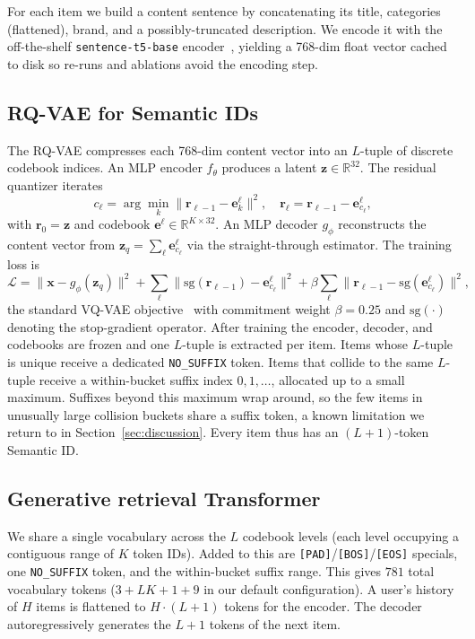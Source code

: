 \documentclass[sigconf]{acmart}
\begin{document}
For each item we build a content sentence by concatenating its title,
categories (flattened), brand, and a possibly-truncated description.
We encode it with the off-the-shelf \texttt{sentence-t5-base}
encoder~\cite{ni2022sentence}, yielding a 768-dim float vector cached
to disk so re-runs and ablations avoid the encoding step.

\subsection{RQ-VAE for Semantic IDs}
The RQ-VAE compresses each 768-dim content vector into an $L$-tuple of
discrete codebook indices.  An MLP encoder $f_\theta$ produces a latent
$\mathbf{z}\in\mathbb{R}^{32}$. The residual quantizer iterates
\[
  c_\ell = \arg\min_{k}\Big\lVert \mathbf{r}_{\ell-1} - \mathbf{e}^\ell_k \Big\rVert^2,\quad
  \mathbf{r}_\ell = \mathbf{r}_{\ell-1} - \mathbf{e}^\ell_{c_\ell},
\]
with $\mathbf{r}_0{=}\mathbf{z}$ and codebook
$\mathbf{e}^\ell\in\mathbb{R}^{K\times 32}$.  An MLP decoder
$g_\phi$ reconstructs the content vector from
$\mathbf{z}_q = \sum_\ell \mathbf{e}^\ell_{c_\ell}$ via the
straight-through estimator.  The training loss is
\[
  \mathcal{L} =
  \lVert \mathbf{x} - g_\phi(\mathbf{z}_q) \rVert^2 +
  \sum_\ell \lVert \mathrm{sg}(\mathbf{r}_{\ell-1}) - \mathbf{e}^\ell_{c_\ell} \rVert^2 +
  \beta \sum_\ell \lVert \mathbf{r}_{\ell-1} - \mathrm{sg}(\mathbf{e}^\ell_{c_\ell}) \rVert^2,
\]
the standard VQ-VAE objective~\cite{vandenoord2017vqvae} with commitment
weight $\beta{=}0.25$ and $\mathrm{sg}(\cdot)$ denoting the
stop-gradient operator.  After training the encoder, decoder, and
codebooks are frozen and one $L$-tuple is extracted per item.  Items
whose $L$-tuple is unique receive a dedicated \texttt{NO\_SUFFIX}
token. Items that collide to the same $L$-tuple receive a within-bucket
suffix index $0,1,\ldots$, allocated up to a small maximum.
Suffixes beyond this maximum wrap around, so the few items in
unusually large collision buckets share a suffix token, a known
limitation we return to in Section~\ref{sec:discussion}.  Every item thus has an
$(L{+}1)$-token Semantic ID.

\subsection{Generative retrieval Transformer}
We share a single vocabulary across the $L$ codebook levels (each
level occupying a contiguous range of $K$ token IDs).  Added to this
are \texttt{[PAD]}\allowbreak/\allowbreak\texttt{[BOS]}\allowbreak/\allowbreak\texttt{[EOS]}
specials, one \texttt{NO\_SUFFIX} token, and the within-bucket suffix
range.  This gives $781$ total vocabulary tokens ($3 + LK + 1 + 9$
in our default configuration).  A user's history
of $H$ items is flattened to $H\cdot(L{+}1)$ tokens for the encoder.
The decoder autoregressively generates the $L{+}1$ tokens of the
next item.
\end{document}
